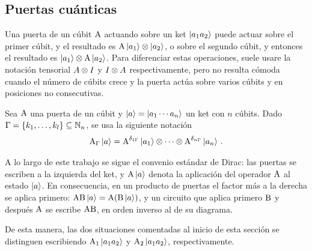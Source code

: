 \subsection{Puertas cuánticas}
Una puerta de un cúbit $\text{A}$ actuando sobre un ket $\ket{a_1 a_2}$ puede actuar sobre el primer cúbit, y el resultado es $\text{A}\ket{a_1}\otimes \ket{a_2}$, o sobre el segundo cúbit, y entonces el resultado es $\ket{a_1}\otimes \text{A}\ket{a_2}$. Para diferenciar estas operaciones, suele usare la notación tensorial $A\otimes I$ y $I\otimes A$ respectivamente, pero no resulta cómoda cuando el número de cúbits crece y la puerta actúa sobre varios cúbits y en posiciones no consecutivas.

\begin{notation}
  Sea $\text{A}$ una puerta de un cúbit y $\ket{a}=\ket{a_1\cdots a_n}$ un ket con $n$ cúbits. Dado $\Gamma=\{k_1,\dots,k_l\}\subseteq\mathbb{N}_n$, se usa la siguiente notación
  \[
    \text{A}_{\Gamma}\ket{a}=
    \text{A}^{\delta_{1\Gamma}}\ket{a_1}\otimes\cdots\otimes\text{A}^{\delta_{n\Gamma}}\ket{a_n}
    \,.
  \]
\end{notation}

\begin{remark}
  A lo largo de este trabajo se sigue el convenio estándar de Dirac: las puertas se escriben a la izquierda del ket, y $\text{A}\ket{a}$ denota la aplicación del operador $\text{A}$ al estado $\ket{a}$. En consecuencia, en un producto de puertas el factor más a la derecha se aplica primero: $\text{A}\text{B}\ket{a}=\text{A}(\text{B}\ket{a})$, y un circuito que aplica primero $\text{B}$ y después $\text{A}$ se escribe $\text{A}\text{B}$, en orden inverso al de su diagrama.
\end{remark}

De esta manera, las dos situaciones comentadas al inicio de esta sección se distinguen escribiendo $\text{A}_1\ket{a_1 a_2}$ y $\text{A}_2\ket{a_1 a_2}$, respectivamente.

